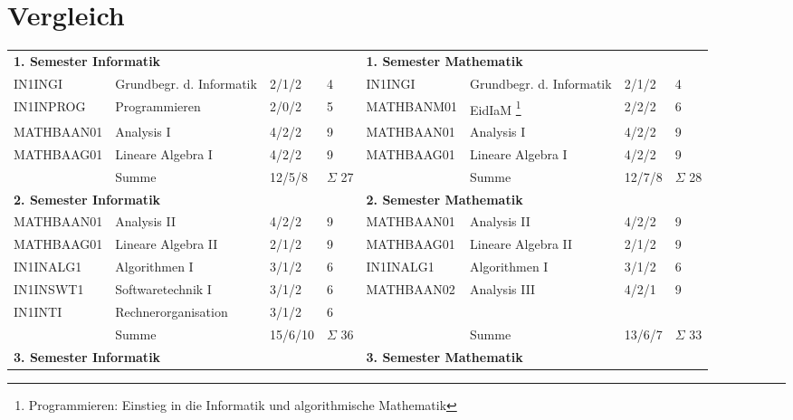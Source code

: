 \documentclass[a4paper,landscape]{scrartcl}
\begin{document}
\section{Vergleich}
\begin{savenotes}
\begin{tabular}{llll || llll}
\multicolumn{4}{l}{\cellcolor{blue!25} \bfseries{1. Semester Informatik}} & \multicolumn{4}{l}{\cellcolor{blue!25} \bfseries{1. Semester Mathematik}}\\
\rowcolor{LightGreen}
 IN1INGI    & Grundbegr. d. Informatik      & 2/1/2 & 4 &  IN1INGI    & Grundbegr. d. Informatik      & 2/1/2 & 4 \\
\rowcolor{VeryLightGreen}
 IN1INPROG  & Programmieren                 & 2/0/2 & 5 & MATHBANM01 & EidIaM \footnote{Programmieren: Einstieg in die Informatik und algorithmische Mathematik}  & 2/2/2 & 6 \\
\rowcolor{LightGreen}
 MATHBAAN01 & Analysis I                    & 4/2/2 & 9 & MATHBAAN01 & Analysis I                    & 4/2/2 & 9 \\
\rowcolor{LightGreen}
 MATHBAAG01 & Lineare Algebra I             & 4/2/2 & 9 & MATHBAAG01 & Lineare Algebra I             & 4/2/2 & 9 \\
            & Summe                         &12/5/8 &$\Sigma$ 27 &            & Summe                         &12/7/8 &$\Sigma$ 28 \\
\multicolumn{4}{l}{\cellcolor{blue!25} \bfseries{2. Semester Informatik}} & \multicolumn{4}{l}{\cellcolor{blue!25} \bfseries{2. Semester Mathematik}}\\
\rowcolor{LightGreen}
 MATHBAAN01 & Analysis II                   & 4/2/2 & 9 & MATHBAAN01 & Analysis II                   & 4/2/2 & 9 \\
\rowcolor{LightGreen}
 MATHBAAG01 & Lineare Algebra II            & 2/1/2 & 9 & MATHBAAG01 & Lineare Algebra II            & 2/1/2 & 9 \\
\rowcolor{LightGreen}
 IN1INALG1  & Algorithmen I                 & 3/1/2 & 6 & IN1INALG1  & Algorithmen I                 & 3/1/2 & 6 \\
 IN1INSWT1  & Softwaretechnik I             & 3/1/2 & 6 & MATHBAAN02 & Analysis III                  & 4/2/1 & 9 \\
 IN1INTI    & Rechnerorganisation           & 3/1/2 & 6  \\
            & Summe                         &15/6/10&$\Sigma$ 36 &   & Summe                         &13/6/7&$\Sigma$ 33 \\
\multicolumn{4}{l}{\cellcolor{blue!25} \bfseries{3. Semester Informatik}} & \multicolumn{4}{l}{\cellcolor{blue!25} \bfseries{3. Semester Mathematik}}\\

\end{tabular}
\end{savenotes}
\end{document}
